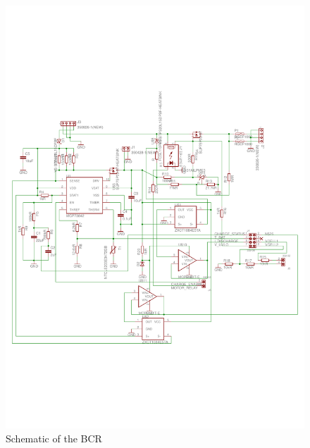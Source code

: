 \begin{figure}[H]
\centering
\includegraphics[width=\textwidth]{figures/fig_Schematic_BCR}
\caption{Schematic of the \acl{BCR}}
\label{fig:BCR_Schematic}
\end{figure}
%
%
